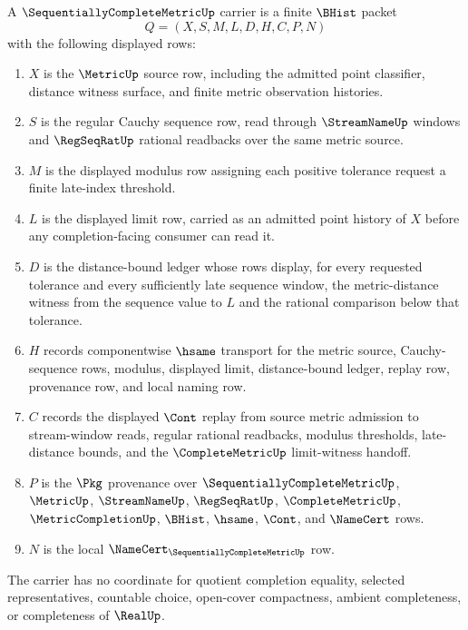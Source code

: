 \begin{definition}
\label{def:sequentially-complete-metric-carrier}
A $\SequentiallyCompleteMetricUp$ carrier is a finite $\BHist$ packet
$$
Q=(X,S,M,L,D,H,C,P,N)
$$
with the following displayed rows:
\begin{enumerate}
\item $X$ is the $\MetricUp$ source row, including the admitted point classifier, distance witness surface, and finite metric observation histories.
\item $S$ is the regular Cauchy sequence row, read through $\StreamNameUp$ windows and $\RegSeqRatUp$ rational readbacks over the same metric source.
\item $M$ is the displayed modulus row assigning each positive tolerance request a finite late-index threshold.
\item $L$ is the displayed limit row, carried as an admitted point history of $X$ before any completion-facing consumer can read it.
\item $D$ is the distance-bound ledger whose rows display, for every requested tolerance and every sufficiently late sequence window, the metric-distance witness from the sequence value to $L$ and the rational comparison below that tolerance.
\item $H$ records componentwise $\hsame$ transport for the metric source, Cauchy-sequence rows, modulus, displayed limit, distance-bound ledger, replay row, provenance row, and local naming row.
\item $C$ records the displayed $\Cont$ replay from source metric admission to stream-window reads, regular rational readbacks, modulus thresholds, late-distance bounds, and the $\CompleteMetricUp$ limit-witness handoff.
\item $P$ is the $\Pkg$ provenance over $\SequentiallyCompleteMetricUp$, $\MetricUp$, $\StreamNameUp$, $\RegSeqRatUp$, $\CompleteMetricUp$, $\MetricCompletionUp$, $\BHist$, $\hsame$, $\Cont$, and $\NameCert$ rows.
\item $N$ is the local $\NameCert_{\SequentiallyCompleteMetricUp}$ row.
\end{enumerate}
The carrier has no coordinate for quotient completion equality, selected representatives, countable choice, open-cover compactness, ambient completeness, or completeness of $\RealUp$.
\end{definition}

